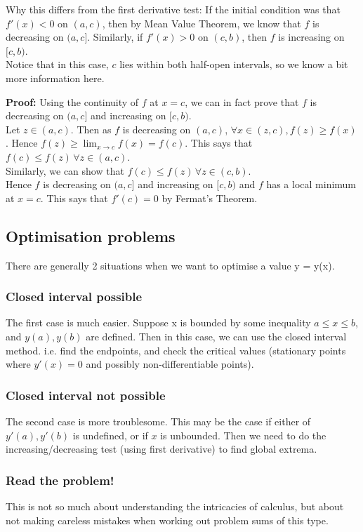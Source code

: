 \documentclass{article}
\begin{document}
Why this differs from the first derivative test: If the initial condition was that $f'(x)<0$ on $(a,c)$, then by Mean Value Theorem, we know that $f$ is decreasing on $(a,c]$. Similarly, if $f'(x)>0$ on $(c,b)$, then $f$ is increasing on $[c,b)$.\\
Notice that in this case, $c$ lies within both half-open intervals, so we know a bit more information here.

\textbf{Proof:} Using the continuity of $f$ at $x=c$, we can in fact prove that $f$ is decreasing on $(a,c]$ and increasing on $[c,b)$.\\
Let $z\in (a,c)$. Then as $f$ is decreasing on $(a,c)$, $\forall x\in (z,c), f(z)\geq f(x)$. Hence $f(z)\geq \lim_{x\rightarrow c}f(x)=f(c)$. This says that $f(c)\leq f(z)\, \forall z\in (a,c)$.\\
Similarly, we can show that $f(c)\leq f(z)\, \forall z\in (c,b)$.\\
Hence $f$ is decreasing on $(a,c]$ and increasing on $[c,b)$ and $f$ has a local minimum at $x=c$. This says that $f'(c)=0$ by Fermat's Theorem.

\subsection{Optimisation problems}
There are generally 2 situations when we want to optimise a value y = y(x).
\subsubsection{Closed interval possible}
The first case is much easier. Suppose x is bounded by some inequality $a\leq x\leq b$, and $y(a),y(b)$ are defined. Then in this case, we can use the closed interval method. i.e. find the endpoints, and check the critical values (stationary points where $y'(x)=0$ and possibly non-differentiable points).

\subsubsection{Closed interval not possible}
The second case is more troublesome. This may be the case if either of $y'(a),y'(b)$ is undefined, or if $x$ is unbounded. Then we need to do the increasing/decreasing test (using first derivative) to find global extrema.

\subsubsection{Read the problem!}
This is not so much about understanding the intricacies of calculus, but about not making careless mistakes when working out problem sums of this type.
\end{document}
